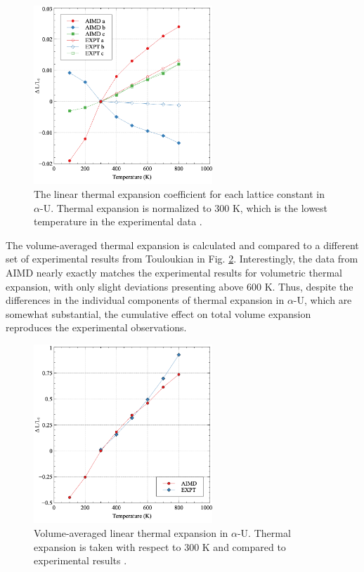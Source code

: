 \documentclass[review]{elsarticle}
\begin{document}
 \begin{figure}[hbt]
	\centering
	\includegraphics[width=0.6\textwidth]{fig2.png}
    \caption{The linear thermal expansion coefficient for each lattice constant in $\alpha$-U. Thermal expansion is normalized to 300 K, which is the lowest temperature in the experimental data \cite{grenthe2010, lloyd1966}. }\label{fig:exp}
\end{figure}

\FloatBarrier

The volume-averaged thermal expansion is calculated and compared to a different set of experimental results from Touloukian \cite{touloukian} in Fig. \ref{fig:vol}. Interestingly, the data from AIMD nearly exactly matches the experimental results for volumetric thermal expansion, with only slight deviations presenting above 600 K. Thus, despite the differences in the individual components of thermal expansion in $\alpha$-U, which are somewhat substantial, the cumulative effect on total volume expansion reproduces the experimental observations. 

 \begin{figure}[hbt]
	\centering
	\includegraphics[width=0.6\textwidth]{fig3.png}
    \caption{Volume-averaged linear thermal expansion in $\alpha$-U. Thermal expansion is taken with respect to 300 K and compared to experimental results \cite{touloukian}.}\label{fig:vol}
\end{figure}
\end{document}

